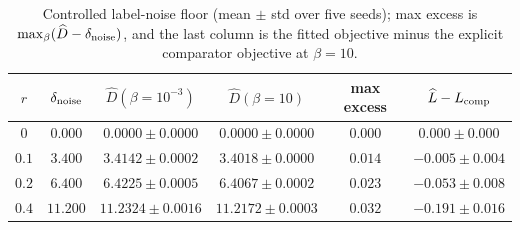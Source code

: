 \begin{table}[t]
\centering
\small
\setlength{\tabcolsep}{4pt}
\begin{tabular}{c c c c c c}
\hline
$r$ & $\delta_{\rm noise}$ & $\widehat D(\beta{=}10^{-3})$ & $\widehat D(\beta{=}10)$ & max excess & $\widehat L-L_{\rm comp}$ \\
\hline
$0$ & $0.000$ & $0.0000\pm0.0000$ & $0.0000\pm0.0000$ & $0.000$ & $0.000\pm0.000$ \\
$0.1$ & $3.400$ & $3.4142\pm0.0002$ & $3.4018\pm0.0000$ & $0.014$ & $-0.005\pm0.004$ \\
$0.2$ & $6.400$ & $6.4225\pm0.0005$ & $6.4067\pm0.0002$ & $0.023$ & $-0.053\pm0.008$ \\
$0.4$ & $11.200$ & $11.2324\pm0.0016$ & $11.2172\pm0.0003$ & $0.032$ & $-0.191\pm0.016$ \\
\hline
\end{tabular}
\caption{Controlled label-noise floor (mean $\pm$ std over five seeds); max excess is $\max_\beta(\widehat D-\delta_{\rm noise})$, and the last column is the fitted objective minus the explicit comparator objective at $\beta=10$.}
\label{tab:controlled-noisy-alignment}
\end{table}
